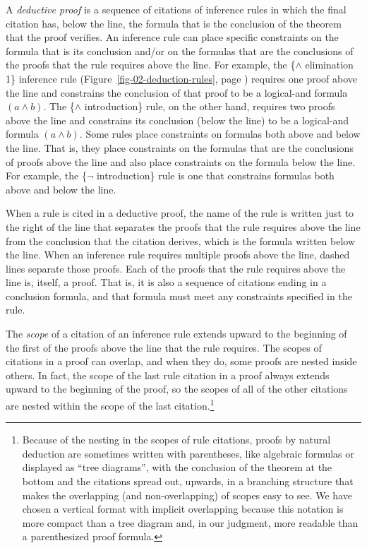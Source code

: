 \label{def-deductive-proof}
A \emph{deductive proof} is a sequence of citations of inference rules
in which the final citation has, below the line,
the formula that is the conclusion of the theorem that the proof verifies.
An inference rule can place specific constraints on the formula
that is its conclusion and/or on the formulas that are the
conclusions of the proofs that the rule requires above the line.
For example, the \{$\wedge$ elimination 1\} inference rule
(Figure~\ref{fig-02-deduction-rules}, page \pageref{fig-02-deduction-rules})
requires one proof above the line
and constrains the conclusion of that proof
to be a logical-and formula $(a \wedge b)$.
The \{$\wedge$ introduction\} rule, on the other hand,
requires two proofs above the line and
constrains its conclusion (below the line)
to be a logical-and formula $(a \wedge b)$.
Some rules place constraints on formulas both
above and below the line.
That is, they place constraints on the formulas
that are the conclusions of proofs above the line
and also place constraints
on the formula below the line.
For example, the \{$\neg$ introduction\} rule is one that
constrains formulas both above and below the line.

When a rule is cited in a deductive proof,
the name of the rule is written just to the right of
the line that separates the proofs that the rule requires above the line
from the conclusion that the citation derives,
which is the formula written below the line.
When an inference rule requires multiple proofs above the line,
dashed lines separate those proofs.
Each of the proofs that the rule requires above the line
is, itself, a proof.
That is, it is also a sequence of citations ending in a conclusion formula,
and that formula must meet any constraints
specified in the rule.

The \emph{scope} of a citation of an inference rule
extends upward to the beginning of the first of the proofs
above the line that the rule requires.
The scopes of citations in a proof can overlap,
and when they do, some proofs are nested inside others.
In fact, the scope of the last rule citation in a proof
always extends upward to the beginning of the proof,
so the scopes of all of the other citations are nested
within the scope of the last citation.\footnote{Because
of the nesting in the scopes of rule citations,
proofs by natural deduction
are sometimes written with parentheses,
like algebraic formulas
or displayed as ``tree diagrams'',
with the conclusion of the theorem at the bottom and
the citations spread out, upwards,
in a branching structure
that makes the overlapping (and non-overlapping)
of scopes easy to see.
We have chosen a vertical format with implicit
overlapping because this notation is more compact
than a tree diagram and, in our judgment,
more readable than a parenthesized proof formula.}

